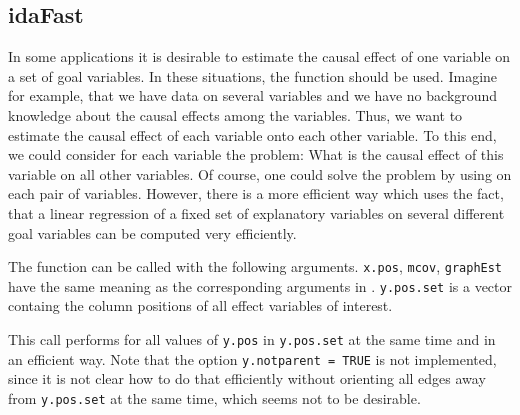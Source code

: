 \documentclass[article]{jss}
\begin{document}
\subsection{idaFast}
In some applications it is desirable to estimate the causal effect of one
variable on a set of goal variables. In these situations, the function
 should be used. Imagine for example, that we have data
on several variables and we have no background knowledge about the causal
effects among the variables. Thus, we want to estimate the causal effect of
each variable onto each other variable. To this end, we could consider for
each variable the problem: What is the causal effect of this variable on
all other variables. Of course, one could solve the problem by using  on
each pair of variables. However, there is a more efficient way which uses
the fact, that a linear regression of a fixed set of explanatory variables
on several different goal variables can be computed very efficiently.

The function  can be called with the following arguments.
\texttt{x.pos}, \texttt{mcov}, \texttt{graphEst} have the same meaning as
the corresponding arguments in . \texttt{y.pos.set} is a vector
containg the column positions of all effect variables of interest.

This call performs  for all values of \texttt{y.pos} in
\texttt{y.pos.set} at the same time and in an efficient way. Note that the
option \texttt{y.notparent = TRUE} is not implemented, since it is not
clear how to do that efficiently without orienting all edges away from
\texttt{y.pos.set} at the same time, which seems not to be desirable.
\end{document}

